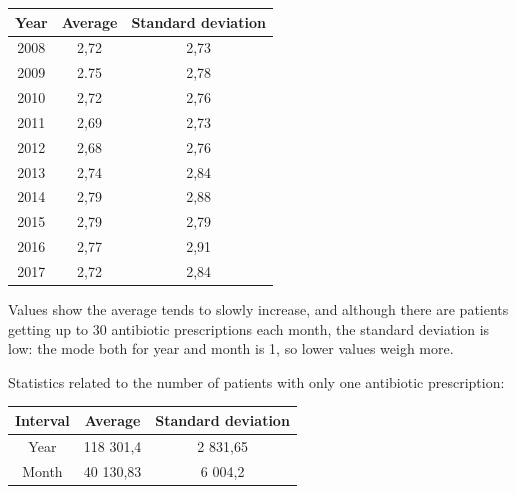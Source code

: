 \begin{center}
	\begin{tabular}{|c|c|c|}
		\hline
		Year & Average & Standard deviation \\
		\hline
		2008 & 2,72 & 2,73 \\
		\hline
		2009 & 2.75 & 2,78 \\
		\hline
		2010 & 2,72 &  2,76 \\
		\hline
		2011 & 2,69 &  2,73 \\
		\hline
		2012 & 2,68 & 2,76 \\
		\hline
		2013 & 2,74 & 2,84 \\
		\hline
		2014 & 2,79 & 2,88 \\
		\hline
		2015 & 2,79 & 2,79 \\
		\hline
		2016 & 2,77 & 2,91 \\
		\hline
		2017 & 2,72 & 2,84 \\
		\hline
	\end{tabular}
\end{center}

Values show the average tends to slowly increase, and although there are patients getting up to 30 antibiotic prescriptions each month, the standard deviation is low: the mode both for year and month is 1, so lower values weigh more.

Statistics related to the number of patients with only one antibiotic prescription:
\begin{center}
	\begin{tabular}{|c|c|c|}
		\hline
		Interval & Average & Standard deviation \\
		\hline
		Year & 118 301,4 & 2 831,65 \\
		\hline
		Month & 40 130,83 & 6 004,2 \\
		\hline
	\end{tabular}
\end{center}

